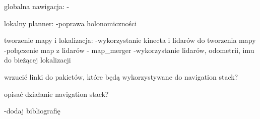\documentclass{report}
\begin{document}
globalna nawigacja:
	-
	
lokalny planner:
	-poprawa holonomiczności
	
tworzenie mapy i lokalizacja:
	-wykorzystanie kinecta i lidarów do tworzenia mapy
	-połączenie map z lidarów - map\_merger
	-wykorzystanie lidarów, odometrii, imu do bieżącej lokalizacji
	
wrzucić linki do pakietów, które będą wykorzystywane do navigation stack?

opisać działanie navigation stack?
	
	

	


	
		
	
	
	
	
	
	-dodaj bibliografię
	
		
\end{document}
